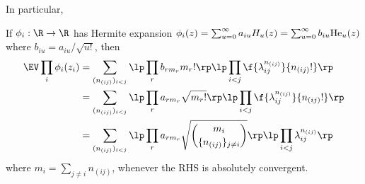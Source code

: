 \documentclass[main.tex]{subfiles}
\begin{document}
In particular, 
\begin{thm}\label{thm:multivariateHermiteExpectation}
If $\phi_i: \R \to \R$ has Hermite expansion $\phi_i(z) = \sum_{u=0}^\infty a_{iu} H_u(z) = \sum_{u=0}^\infty b_{iu} \mathrm{He}_u(z)$ where $b_{iu} = a_{iu}/\sqrt{u!}$, then
\begin{align*}
    \EV \prod_i \phi_i(z_i)
        &=
            \sum_{(n_{(ij)})_{i<j}}
                \lp \prod_r b_{r m_r} m_r! \rp 
                \lp \prod_{i<j} \f{\lambda_{ij}^{n_{(ij)}}}
                                    {n_{(ij)}!}
                    \rp
            \\
        &=
            \sum_{(n_{(ij)})_{i<j}}
                \lp \prod_r a_{r m_r} \sqrt{m_r!} \rp 
                \lp \prod_{i<j} \f{\lambda_{ij}^{n_{(ij)}}}
                                    {n_{(ij)}!}
                    \rp
            \\
        &=
            \sum_{(n_{(ij)})_{i<j}}
                \lp \prod_r a_{r m_r} \sqrt{\binom{m_i}{\{n_{(ij)}\}_{j \ne i}}} \rp 
                \lp \prod_{i<j} \lambda_{ij}^{n_{(ij)}}
                    \rp
\end{align*}
where $m_i = \sum_{j\ne i} n_{(ij)}$, whenever the RHS is absolutely convergent.
\end{thm}
\end{document}
